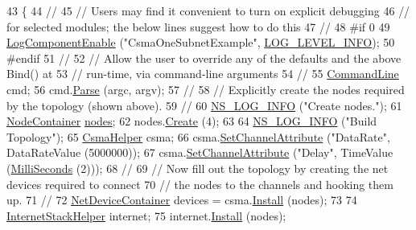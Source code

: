 \begin{DoxyCode}
43 \{
44 \textcolor{comment}{//}
45 \textcolor{comment}{// Users may find it convenient to turn on explicit debugging}
46 \textcolor{comment}{// for selected modules; the below lines suggest how to do this}
47 \textcolor{comment}{//}
48 \textcolor{preprocessor}{#if 0 }
49   \hyperlink{namespacens3_adc4ef4f00bb2f5f4edae67fc3bc27f20}{LogComponentEnable} (\textcolor{stringliteral}{"CsmaOneSubnetExample"}, \hyperlink{namespacens3_aa6464a4d69551a9cc968e17a65f39bdbae36aedc880de94fd5a5b53bb9fe65628}{LOG\_LEVEL\_INFO});
50 \textcolor{preprocessor}{#endif}
51 \textcolor{comment}{//}
52 \textcolor{comment}{// Allow the user to override any of the defaults and the above Bind() at}
53 \textcolor{comment}{// run-time, via command-line arguments}
54 \textcolor{comment}{//}
55   \hyperlink{classns3_1_1CommandLine}{CommandLine} cmd;
56   cmd.\hyperlink{classns3_1_1CommandLine_a5c10b85b3207e5ecb48d907966923156}{Parse} (argc, argv);
57 \textcolor{comment}{//}
58 \textcolor{comment}{// Explicitly create the nodes required by the topology (shown above).}
59 \textcolor{comment}{//}
60   \hyperlink{group__logging_gafbd73ee2cf9f26b319f49086d8e860fb}{NS\_LOG\_INFO} (\textcolor{stringliteral}{"Create nodes."});
61   \hyperlink{classns3_1_1NodeContainer}{NodeContainer} \hyperlink{visualizer-ideas_8txt_a3e1b3808014a2c68ab0cd0182e041be2}{nodes};
62   nodes.\hyperlink{classns3_1_1NodeContainer_a787f059e2813e8b951cc6914d11dfe69}{Create} (4);
63 
64   \hyperlink{group__logging_gafbd73ee2cf9f26b319f49086d8e860fb}{NS\_LOG\_INFO} (\textcolor{stringliteral}{"Build Topology"});
65   \hyperlink{classns3_1_1CsmaHelper}{CsmaHelper} csma;
66   csma.\hyperlink{classns3_1_1CsmaHelper_a886d900b2fe44433e0b81752dea7e7f1}{SetChannelAttribute} (\textcolor{stringliteral}{"DataRate"}, DataRateValue (5000000));
67   csma.\hyperlink{classns3_1_1CsmaHelper_a886d900b2fe44433e0b81752dea7e7f1}{SetChannelAttribute} (\textcolor{stringliteral}{"Delay"}, TimeValue (\hyperlink{group__timecivil_gaf26127cf4571146b83a92ee18679c7a9}{MilliSeconds} (2)));
68 \textcolor{comment}{//}
69 \textcolor{comment}{// Now fill out the topology by creating the net devices required to connect}
70 \textcolor{comment}{// the nodes to the channels and hooking them up.}
71 \textcolor{comment}{//}
72   \hyperlink{classns3_1_1NetDeviceContainer}{NetDeviceContainer} devices = csma.\hyperlink{classns3_1_1CsmaHelper_af79a91372595230b0817200270ab84e7}{Install} (nodes);
73 
74   \hyperlink{classns3_1_1InternetStackHelper}{InternetStackHelper} internet;
75   internet.\hyperlink{classns3_1_1InternetStackHelper_a6645b412f31283d2d9bc3d8a95cebbc0}{Install} (nodes);

\end{DoxyCode}
